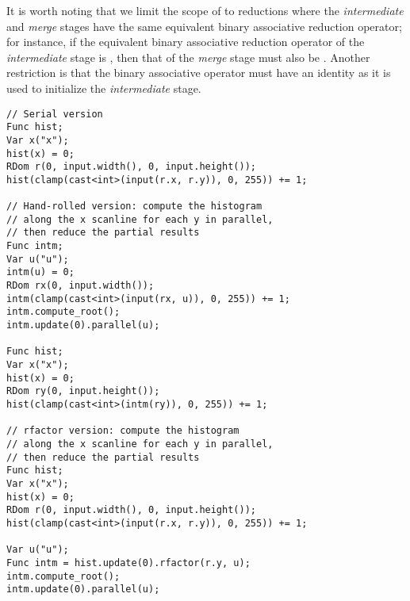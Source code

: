 It is worth noting that we limit the scope of  to reductions where the \emph{intermediate} and \emph{merge} stages have the same equivalent binary associative reduction operator; for instance, if the equivalent binary associative reduction operator of the \emph{intermediate} stage is , then that of the \emph{merge} stage must also be . Another restriction is that the binary associative operator must have an identity as it is used to initialize the \emph{intermediate} stage.

\begin{lstlisting}[caption={Histogram of a two-dimensional image: serial vs. parallel hand-rolled vs. parallel rfactor.}, label={lst:histogram_rfactor}]
// Serial version
Func hist;
Var x("x");
hist(x) = 0;
RDom r(0, input.width(), 0, input.height());
hist(clamp(cast<int>(input(r.x, r.y)), 0, 255)) += 1;

// Hand-rolled version: compute the histogram 
// along the x scanline for each y in parallel, 
// then reduce the partial results
Func intm;
Var u("u");
intm(u) = 0;
RDom rx(0, input.width());
intm(clamp(cast<int>(input(rx, u)), 0, 255)) += 1;
intm.compute_root();
intm.update(0).parallel(u);

Func hist;
Var x("x");
hist(x) = 0;
RDom ry(0, input.height());
hist(clamp(cast<int>(intm(ry)), 0, 255)) += 1;

// rfactor version: compute the histogram 
// along the x scanline for each y in parallel, 
// then reduce the partial results
Func hist;
Var x("x");
hist(x) = 0;
RDom r(0, input.width(), 0, input.height());
hist(clamp(cast<int>(input(r.x, r.y)), 0, 255)) += 1;

Var u("u");
Func intm = hist.update(0).rfactor(r.y, u);
intm.compute_root();
intm.update(0).parallel(u);
\end{lstlisting}

